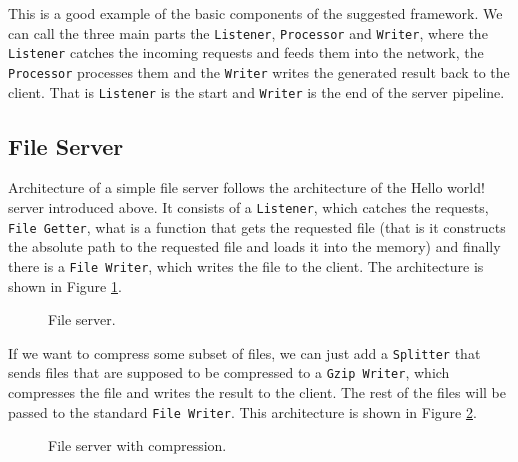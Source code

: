 \documentclass[12pt,a4paper]{article}
\begin{document}
This is a good example of the basic components of the suggested framework.
We can call the three main parts the \texttt{Listener}, \texttt{Processor} 
and \texttt{Writer}, where
the \texttt{Listener} catches the incoming requests and feeds them into the network,
the \texttt{Processor} processes them and the \texttt{Writer} writes the generated result 
back to the client. That is \texttt{Listener} is the start and \texttt{Writer}
is the end of the server pipeline.

\subsection{File Server}
\label{sec:fileServer}
Architecture of a simple file server follows the architecture of the Hello world!
server introduced above. It consists of a \texttt{Listener}, which catches the requests,
\texttt{File Getter}, what is a function that gets the requested file (that is it
constructs the absolute path to the requested file and loads it into the memory) 
and finally there is a \texttt{File Writer}, which
writes the file to the client. The architecture is shown in Figure \ref{fig:fileServer}.
\begin{figure}[h]
\centering
{}
\caption[scale=1.0]{File server.}
\label{fig:fileServer}
\end{figure}

If we want to compress some subset of files, we can just add a \texttt{Splitter}
that sends files that are supposed to be compressed to a \texttt{Gzip Writer}, which
compresses the file and writes the result to the client. The rest of the files
will be passed to the standard \texttt{File Writer}. This architecture is shown in
Figure \ref{fig:fileServer2}.

\begin{figure}[h]
\centering
{}
\caption[scale=1.0]{File server with compression.}
\label{fig:fileServer2}
\end{figure}
\end{document}
